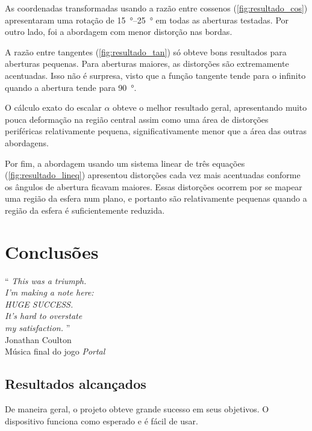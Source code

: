 \documentclass[brazil,pagestart=firstchapter]{abnt}
\begin{document}
As coordenadas transformadas usando a razão entre cossenos
(\ref{fig:resultado_cos}) apresentaram uma rotação de
\SIrange{15}{25}{\degree} em todas as aberturas testadas. Por outro lado,
foi a abordagem com menor distorção nas bordas.

A razão entre tangentes (\ref{fig:resultado_tan}) só obteve bons resultados
para aberturas pequenas. Para aberturas maiores, as distorções são
extremamente acentuadas. Isso não é surpresa, visto que a função tangente
tende para o infinito quando a abertura tende para \SI{90}{\degree}.

O cálculo exato do escalar $\alpha$ obteve o melhor resultado geral,
apresentando muito pouca deformação na região central assim como uma área de
distorções periféricas relativamente pequena, significativamente menor que a
área das outras abordagens.

Por fim, a abordagem usando um sistema linear de três equações
(\ref{fig:resultado_lineq}) apresentou distorções cada vez mais acentuadas
conforme os ângulos de abertura ficavam maiores. Essas distorções ocorrem
por se mapear uma região da esfera num plano, e portanto são relativamente
pequenas quando a região da esfera é suficientemente reduzida.


\chapter{Conclusões}
\label{cap:conclusoes}


\vfill{}
\begin{flushright}{}
``\emph{
	This was a triumph.    \\
	I'm making a note here:\\
	HUGE SUCCESS.          \\
	It's hard to overstate \\
	my satisfaction.
}''\\
{\small Jonathan Coulton} \\
{\small Música final do jogo \textit{Portal}}
\end{flushright}{\small \par}
\vfill{}

\newpage


\section{Resultados alcançados}
\label{sec:resultados}

De maneira geral, o projeto obteve grande sucesso em seus objetivos. O
dispositivo funciona como esperado e é fácil de usar.
\end{document}
